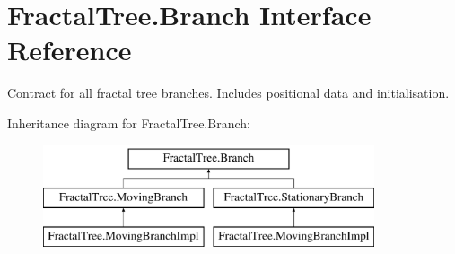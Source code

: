 \hypertarget{interface_fractal_tree_1_1_branch}{}\section{Fractal\+Tree.\+Branch Interface Reference}
\label{interface_fractal_tree_1_1_branch}


Contract for all fractal tree branches. Includes positional data and initialisation.  


Inheritance diagram for Fractal\+Tree.\+Branch\+:\begin{figure}[H]
\begin{center}
\leavevmode
\includegraphics[height=3.000000cm]{interface_fractal_tree_1_1_branch}
\end{center}
\end{figure}
